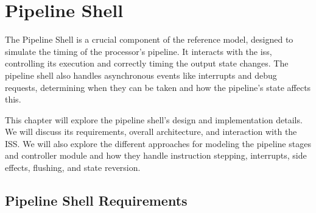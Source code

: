 \chapter{Pipeline Shell}
\label{ch:PipelineShell}


The Pipeline Shell is a crucial component of the reference model, designed to simulate the timing of the processor's pipeline. It interacts with the \acrfull{iss}, controlling its execution and correctly timing the output state changes. The pipeline shell also handles asynchronous events like interrupts and debug requests, determining when they can be taken and how the pipeline's state affects this.

This chapter will explore the pipeline shell's design and implementation details. We will discuss its requirements, overall architecture, and interaction with the ISS. We will also explore the different approaches for modeling the pipeline stages and controller module and how they handle instruction stepping, interrupts, side effects, flushing, and state reversion.


\section{Pipeline Shell Requirements}

